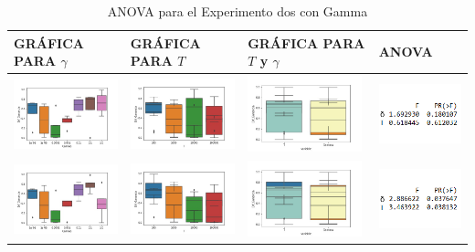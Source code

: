 \begin{table}[H]
\caption{ANOVA para el Experimento dos con Gamma}
\centering
\begin{tabular}[c]{llll}
\multicolumn{1}{p{2.9cm}}{\textbf{GRÁFICA PARA $\gamma$}} & \multicolumn{1}{p{2.9cm}}{\textbf{GRÁFICA PARA $T$}} & \multicolumn{1}{p{2.9cm}}{\textbf{GRÁFICA PARA $T$ y $\gamma$}} & \multicolumn{1}{p{2.9cm}}{\textbf{ANOVA}}  \\ \hline
\multicolumn{1}{|l|}{\includegraphics[align=t, width=33mm]{cajasGamma_exp31.jpg}}    & \multicolumn{1}{l|}{\includegraphics[align=t, width=33mm]{cajasT_exp31.jpg} } & \multicolumn{1}{l|}{\includegraphics[align=t, width=33mm]{cajasT_Gamma_exp31.jpg} } &
\multicolumn{1}{p{3cm}|}{\includegraphics[align=t, width=30mm]{Anova31.png}}     \\ \hline
\multicolumn{1}{|l|}{\includegraphics[align=t, width=33mm]{cajasGamma_exp32.jpg}}    & \multicolumn{1}{l|}{\includegraphics[align=t, width=33mm]{cajasT_exp32.jpg} } & \multicolumn{1}{l|}{\includegraphics[align=t, width=33mm]{cajasT_Gamma_exp32.jpg} } & \multicolumn{1}{p{3cm}|}{\includegraphics[align=t, width=30mm]{Anova32.png}} \\ \hline

\end{tabular}
\end{table}
